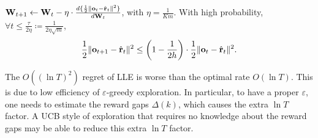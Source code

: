 	\begin{lem}
		\label{lem:logit_l2_loss_parameter_smoothness}
		${\mathbf{W}}_{t+1} \gets {\mathbf{W}}_t - \eta \cdot \frac{d \{ \frac{1}{2} \| {\mathbf{o}}_t - \hat{{\mathbf{r}}}_t \|^2 \}}{d {\mathbf{W}}_t}$, with $\eta = \frac{1}{K m}$. With high probability, $\forall t \le \frac{\tau}{2 \eta} \coloneqq \frac{1}{2 \eta \sqrt{m}}$, 
		\begin{equation*}
		\begin{split}
		\frac{1}{2} \| {\mathbf{o}}_{t+1} - \hat{{\mathbf{r}}}_t \|^2 \le \left( 1 - \frac{1}{2 h} \right) \cdot \frac{1}{2} \| {\mathbf{o}}_t - \hat{{\mathbf{r}}}_t \|^2.
		\end{split}
		\end{equation*}
	\end{lem}
	
\begin{remk}
	The $O((\ln T)^2)$ regret of LLE is worse than the optimal rate $O(\ln T)$. 
	This is due to low efficiency of $\varepsilon$-greedy exploration.
	In particular, to have a proper $\varepsilon$, one needs to estimate the reward gaps $\Delta(k)$, which causes the extra $\ln T$ factor.
	A UCB style of exploration that requires no knowledge about the reward gaps may be able to reduce this extra $\ln T$ factor.
\end{remk}

